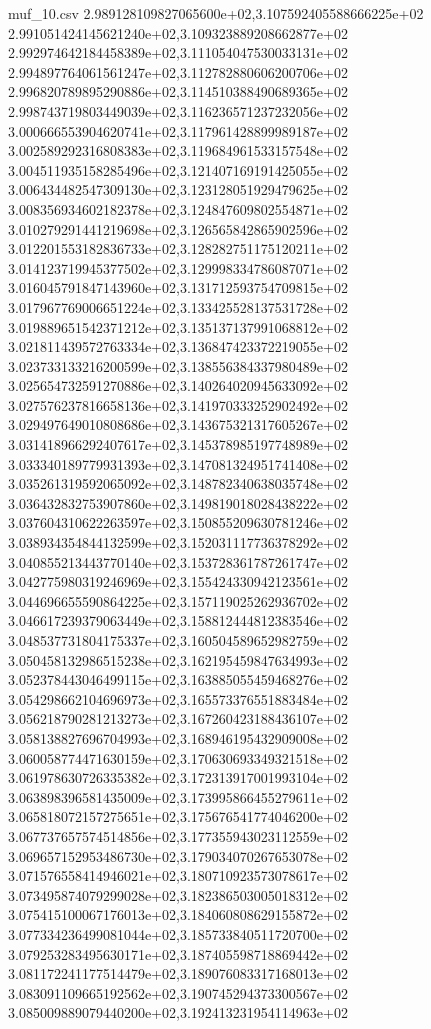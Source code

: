 \begin{filecontents*}{muf_10.csv}
2.989128109827065600e+02,3.107592405588666225e+02
2.991051424145621240e+02,3.109323889208662877e+02
2.992974642184458389e+02,3.111054047530033131e+02
2.994897764061561247e+02,3.112782880606200706e+02
2.996820789895290886e+02,3.114510388490689365e+02
2.998743719803449039e+02,3.116236571237232056e+02
3.000666553904620741e+02,3.117961428899989187e+02
3.002589292316808383e+02,3.119684961533157548e+02
3.004511935158285496e+02,3.121407169191425055e+02
3.006434482547309130e+02,3.123128051929479625e+02
3.008356934602182378e+02,3.124847609802554871e+02
3.010279291441219698e+02,3.126565842865902596e+02
3.012201553182836733e+02,3.128282751175120211e+02
3.014123719945377502e+02,3.129998334786087071e+02
3.016045791847143960e+02,3.131712593754709815e+02
3.017967769006651224e+02,3.133425528137531728e+02
3.019889651542371212e+02,3.135137137991068812e+02
3.021811439572763334e+02,3.136847423372219055e+02
3.023733133216200599e+02,3.138556384337980489e+02
3.025654732591270886e+02,3.140264020945633092e+02
3.027576237816658136e+02,3.141970333252902492e+02
3.029497649010808686e+02,3.143675321317605267e+02
3.031418966292407617e+02,3.145378985197748989e+02
3.033340189779931393e+02,3.147081324951741408e+02
3.035261319592065092e+02,3.148782340638035748e+02
3.036432832753907860e+02,3.149819018028438222e+02
3.037604310622263597e+02,3.150855209630781246e+02
3.038934354844132599e+02,3.152031117736378292e+02
3.040855213443770140e+02,3.153728361787261747e+02
3.042775980319246969e+02,3.155424330942123561e+02
3.044696655590864225e+02,3.157119025262936702e+02
3.046617239379063449e+02,3.158812444812383546e+02
3.048537731804175337e+02,3.160504589652982759e+02
3.050458132986515238e+02,3.162195459847634993e+02
3.052378443046499115e+02,3.163885055459468276e+02
3.054298662104696973e+02,3.165573376551883484e+02
3.056218790281213273e+02,3.167260423188436107e+02
3.058138827696704993e+02,3.168946195432909008e+02
3.060058774471630159e+02,3.170630693349321518e+02
3.061978630726335382e+02,3.172313917001993104e+02
3.063898396581435009e+02,3.173995866455279611e+02
3.065818072157275651e+02,3.175676541774046200e+02
3.067737657574514856e+02,3.177355943023112559e+02
3.069657152953486730e+02,3.179034070267653078e+02
3.071576558414946021e+02,3.180710923573078617e+02
3.073495874079299028e+02,3.182386503005018312e+02
3.075415100067176013e+02,3.184060808629155872e+02
3.077334236499081044e+02,3.185733840511720700e+02
3.079253283495630171e+02,3.187405598718869442e+02
3.081172241177514479e+02,3.189076083317168013e+02
3.083091109665192562e+02,3.190745294373300567e+02
3.085009889079440200e+02,3.192413231954114963e+02

\end{filecontents*}
